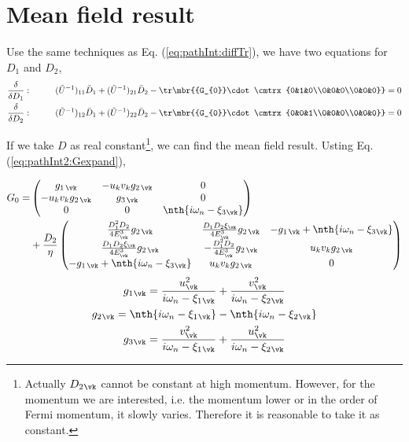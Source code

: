 \section{Mean field result}
 Use the same techniques as Eq. (\ref{eq:pathInt:diffTr}), we have two equations for $D_{1}$ and $D_{2}$,
 \begin{align}
\frac{\delta}{\delta{}D_{1}}:&\qquad&
(\tilde{U}^{-1})_{11}\bar{D}_{1}+(\tilde{U}^{-1})_{21}\bar{D}_{2}-\tr\mbr{{G_{0}}\cdot\cmtrx{0&1&0\\0&0&0\\0&0&0}}=0\\
\frac{\delta}{\delta{}D_{2}}:&\qquad&
(\tilde{U}^{-1})_{12}\bar{D}_{1}+(\tilde{U}^{-1})_{22}\bar{D}_{2}-\tr\mbr{{G_{0}}\cdot\cmtrx{0&0&1\\0&0&0\\0&0&0}}=0
 \end{align}


 If we take $D$ as real constant\footnote{Actually $D_{2}{_{\vk}}$ cannot be constant at high momentum.  However, for the momentum we are interested, i.e. the momentum lower or in the order of Fermi momentum, it slowly varies.  Therefore  it is reasonable to take it as constant.},     we can find the mean field result.  Usting Eq. (\ref{eq:pathInt2:Gexpand}),
 
 \begin{equation}\label{eq:pathInt2:G0}
 \begin{split}
 G_{0}=&
 \begin{pmatrix}
 {g_{1\,\vk}}&
-u_{k}v_{k}{g_{2\,\vk}}&0\\
-u_{k}v_{k}{g_{2\,\vk}}& {g_{3\,\vk}}&0\\
  0&0&\nth{i\omega_{n}-\xi_{3}{}_{\vk}}
 \end{pmatrix}\\
&+\frac{D_{2}}{\eta}
\begin{pmatrix}
\frac{D_{1}^{2}D_{2}}{4E_{\vk}^{3}}g_{2\,\vk}&\frac{D_{1}D_{2}\xi_{\vk}}{4E_{\vk}^{3}}g_{2\,\vk}&-g_{1\,\vk}+\nth{i\omega_{n}-\xi_{3}{}_{\vk}}\\
\frac{D_{1}D_{2}\xi_{\vk}}{4E_{\vk}^{3}}g_{2\,\vk}&-\frac{D_{1}^{2}D_{2}}{4E_{\vk}^{3}}g_{2\,\vk}&u_{k}v_{k}{g_{2\,\vk}}\\
-g_{1\,\vk}+\nth{i\omega_{n}-\xi_{3}{}_{\vk}}&u_{k}v_{k}{g_{2\,\vk}}&0
\end{pmatrix}
\end{split}
 \end{equation}
\begin{gather}
g_{1}{}_{\vk}=\frac{u_{\vk}^{2}}{i\omega_{n}-\xi_{1}{}_{\vk}}+\frac{v_{\vk}^{2}}{i\omega_{n}-\xi_{2}{}_{\vk}}\\
g_{2}{}_{\vk}=\nth{i\omega_{n}-\xi_{1}{}_{\vk}}-\nth{i\omega_{n}-\xi_{2}{}_{\vk}}\\
g_{3}{}_{\vk}=\frac{v_{\vk}^{2}}{i\omega_{n}-\xi_{1}{}_{\vk}}+\frac{u_{\vk}^{2}}{i\omega_{n}-\xi_{2}{}_{\vk}}
\end{gather}

